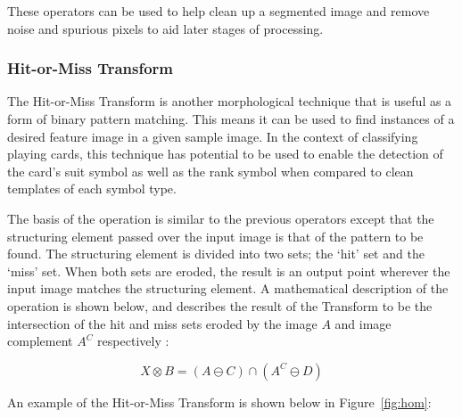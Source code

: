 \documentclass[a4paper,12pt,notitlepage]{article}
\begin{document}
			These operators can be used to help clean up a segmented image and remove noise and spurious pixels to aid later stages of processing.
		\subsubsection{Hit-or-Miss Transform}
			The Hit-or-Miss Transform is another morphological technique that is useful as a form of binary pattern matching. This means it can be used to find instances of a desired feature image in a given sample image. In the context of classifying playing cards, this technique has potential to be used to enable the detection of the card's suit symbol as well as the rank symbol when compared to clean templates of each symbol type.

			The basis of the operation is similar to the previous operators except that the structuring element passed over the input image is that of the pattern to be found. The structuring element is divided into two sets; the `hit' set and the `miss' set. When both sets are eroded, the result is an output point wherever the input image matches the structuring element. A mathematical description of the operation is shown below, and describes the result of the Transform to be the intersection of the hit and miss sets eroded by the image $A$ and image complement $A^C$ respectively \autocite{badea}:

			\begin{equation}
				X \otimes B = ( A \ominus C ) \cap ( A^C \ominus D )
			\end{equation}

			An example of the Hit-or-Miss Transform is shown below in Figure~\ref{fig:hom}:
\end{document}
